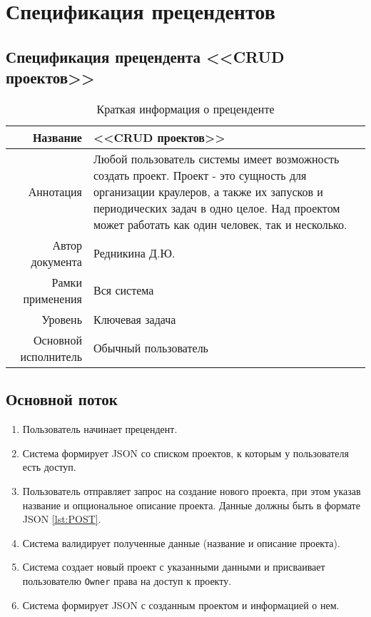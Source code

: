 \documentclass[a4paper,12pt]{article}
\begin{document}
\clearPage
\section{Спецификация прецендентов}
\subsection{Спецификация прецендента <<CRUD проектов>>}

\begin{longtable}[]{|@{\textbf}r|p{7cm}|} 
\caption{Краткая информация о преценденте}
\hline
    Название             & <<CRUD проектов>>   \\ \hline
    Аннотация            & Любой пользователь системы имеет возможность создать проект. Проект - это сущность для организации краулеров, а также их запусков и периодических задач в одно целое. Над проектом может работать как один человек, так и несколько. \\ \hline
    Автор документа      & Редникина Д.Ю.     \\ \hline
    Рамки применения     & Вся система     \\ \hline
    Уровень              & Ключевая задача                     \\ \hline
    Основной исполнитель & Обычный пользователь     \\ \hline
\end{longtable}

\subsection*{Основной поток}

\begin{enumerate}
    \def\labelenumi{\arabic{enumi}.}
    \item Пользователь начинает прецендент.
    \item Система формирует JSON со списком проектов, к которым у пользователя есть доступ. \label{g:start}
    \item Пользователь отправляет запрос на создание нового проекта, при этом указав название и опциональное описание проекта. Данные должны быть в формате JSON \ref{lst:POST}. \label{g:create}
    \item Система валидирует полученные данные (название и описание проекта).
    \item Система создает новый проект с указанными данными и присваивает пользователю \texttt{Owner} права на доступ к проекту.
    \item Система формирует JSON с созданным проектом и информацией о нем.
    \label{g:end}
\end{enumerate}
\end{document}
